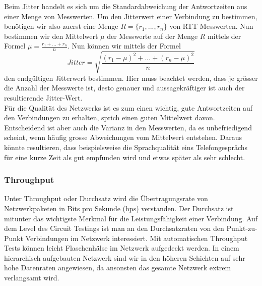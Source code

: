 \documentclass[a4,12pt]{scrartcl}
\begin{document}
\noindent Beim Jitter handelt es sich um die Standardabweichung der Antwortzeiten aus einer Menge von Messwerten. Um den Jitterwert einer Verbindung zu bestimmen, benötigen wir also zuerst eine Menge $R = \{r_1,...,r_n\}$ von RTT Messwerten. Nun bestimmen wir den Mittelwert $\mu$ der Messwerte auf der Menge $R$ mittels der Formel $\mu = \frac{r_1+...+r_n}{n}$. Nun können wir mittels der Formel
\begin{equation}
Jitter = \sqrt{\frac{(r_1-\mu)^2 + ... + (r_n-\mu)^2}{n}}
\end{equation}
den endgültigen Jitterwert bestimmen. Hier muss beachtet werden, dass je grösser die Anzahl der Messwerte ist, desto genauer und aussagekräftiger ist auch der resultierende Jitter-Wert.
\\

\noindent Für die Qualität des Netzwerks ist es zum einen wichtig, gute Antwortzeiten auf den Verbindungen zu erhalten, sprich einen guten Mittelwert davon. Entscheidend ist aber auch die Varianz in den Messwerten, da es unbefriedigend scheint, wenn häufig grosse Abweichungen vom Mittelwert entstehen. Daraus könnte resultieren, dass beispielsweise die Sprachqualität eins Telefongesprächs für eine kurze Zeit als gut empfunden wird und etwas später als sehr schlecht.
\subsubsection{Throughput}
Unter Throughput oder Durchsatz wird die Übertragungsrate von Netzwerkpaketen in Bits pro Sekunde (bps) verstanden. Der Durchsatz ist mitunter das wichtigste Merkmal für die Leistungsfähigkeit einer Verbindung. Auf dem Level des Circuit Testings ist man an den Durchsatzraten von den Punkt-zu-Punkt Verbindungen im Netzwerk interessiert. Mit automatischen Throughput Tests können leicht Flaschenhälse im Netzwerk aufgedeckt werden. In einem hierarchisch aufgebauten Netzwerk sind wir in den höheren Schichten auf sehr hohe Datenraten angewiesen, da ansonsten das gesamte Netzwerk extrem verlangsamt wird.\\
\end{document}
